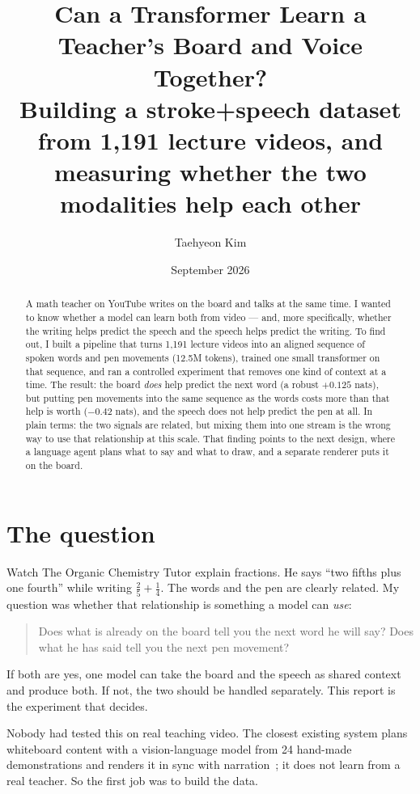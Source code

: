\documentclass[11pt]{article}
\title{Can a Transformer Learn a Teacher's Board and Voice Together?\\[6pt]
\large Building a stroke+speech dataset from 1,191 lecture videos, and measuring whether the two modalities help each other}
\author{Taehyeon Kim}
\date{September 2026}
\begin{document}
\maketitle

\begin{abstract}
A math teacher on YouTube writes on the board and talks at the same time. I wanted to know whether a model can learn both from video --- and, more specifically, whether the writing helps predict the speech and the speech helps predict the writing. To find out, I built a pipeline that turns 1,191 lecture videos into an aligned sequence of spoken words and pen movements (12.5M tokens), trained one small transformer on that sequence, and ran a controlled experiment that removes one kind of context at a time. The result: the board \emph{does} help predict the next word (a robust $+0.125$ nats), but putting pen movements into the same sequence as the words costs more than that help is worth ($-0.42$ nats), and the speech does not help predict the pen at all. In plain terms: the two signals are related, but mixing them into one stream is the wrong way to use that relationship at this scale. That finding points to the next design, where a language agent plans what to say and what to draw, and a separate renderer puts it on the board.
\end{abstract}

\section{The question}

Watch The Organic Chemistry Tutor explain fractions. He says ``two fifths plus one fourth'' while writing $\tfrac{2}{5} + \tfrac{1}{4}$. The words and the pen are clearly related. My question was whether that relationship is something a model can \emph{use}:

\begin{quote}
Does what is already on the board tell you the next word he will say? Does what he has said tell you the next pen movement?
\end{quote}

If both are yes, one model can take the board and the speech as shared context and produce both. If not, the two should be handled separately. This report is the experiment that decides.

Nobody had tested this on real teaching video. The closest existing system plans whiteboard content with a vision-language model from 24 hand-made demonstrations and renders it in sync with narration~\citep{prasad2026whiteboard}; it does not learn from a real teacher. So the first job was to build the data.
\end{document}
